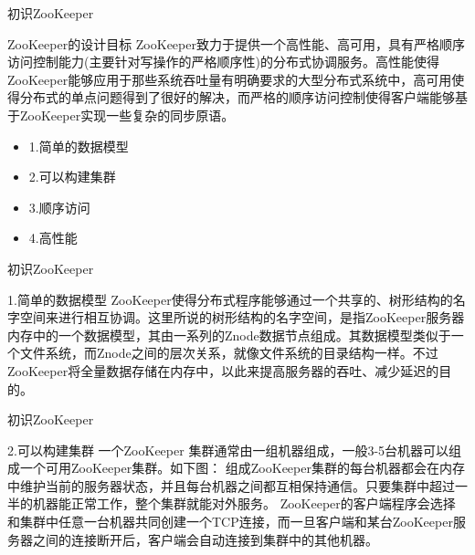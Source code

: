 \documentclass[10pt]{beamer}
\begin{document}
\begin{frame}[fragile]{初识ZooKeeper}
  \begin{alertblock}{ZooKeeper的设计目标}
    \newline
  ZooKeeper致力于提供一个高性能、高可用，具有严格顺序访问控制能力(主要针对写操作的严格顺序性)的分布式协调服务。高性能使得ZooKeeper能够应用于那些系统吞吐量有明确要求的大型分布式系统中，高可用使得分布式的单点问题得到了很好的解决，而严格的顺序访问控制使得客户端能够基于ZooKeeper实现一些复杂的同步原语。
  \end{alertblock}
  \begin{itemize}
    \item 1.简单的数据模型
    \item 2.可以构建集群
    \item 3.顺序访问
    \item 4.高性能
  \end{itemize}
\end{frame}

\begin{frame}[fragile]{初识ZooKeeper}
  \begin{alertblock}{1.简单的数据模型}
    \newline
    ZooKeeper使得分布式程序能够通过一个共享的、树形结构的名字空间来进行相互协调。这里所说的树形结构的名字空间，是指ZooKeeper服务器内存中的一个数据模型，其由一系列的Znode数据节点组成。其数据模型类似于一个文件系统，而Znode之间的层次关系，就像文件系统的目录结构一样。不过ZooKeeper将全量数据存储在内存中，以此来提高服务器的吞吐、减少延迟的目的。
  \end{alertblock}
\end{frame}

\begin{frame}[fragile]{初识ZooKeeper}
  \begin{alertblock}{2.可以构建集群}
    \newline
    一个ZooKeeper 集群通常由一组机器组成，一般3-5台机器可以组成一个可用ZooKeeper集群。如下图：\newline
    组成ZooKeeper集群的每台机器都会在内存中维护当前的服务器状态，并且每台机器之间都互相保持通信。只要集群中超过一半的机器能正常工作，整个集群就能对外服务。\newline
    ZooKeeper的客户端程序会选择和集群中任意一台机器共同创建一个TCP连接，而一旦客户端和某台ZooKeeper服务器之间的连接断开后，客户端会自动连接到集群中的其他机器。
  \end{alertblock}
\end{frame}
\end{document}

